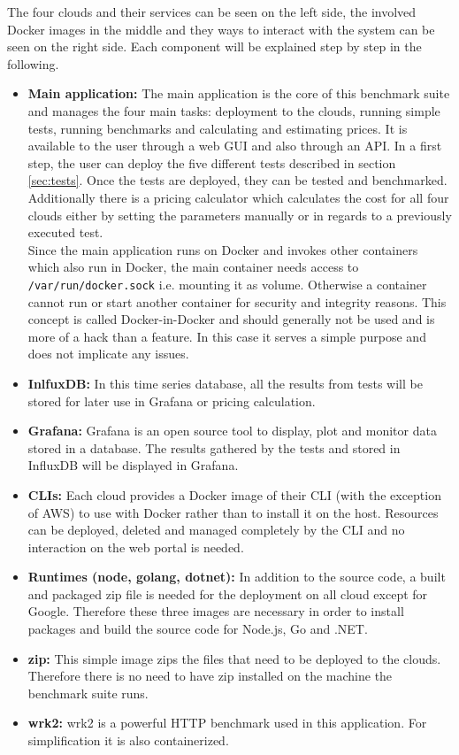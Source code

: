 The four clouds and their services can be seen on the left side, the involved Docker images in the middle and they ways to interact with the system can be seen on the right side. Each component will be explained step by step in the following.
\begin{itemize}
    \item \textbf{Main application:} The main application is the core of this benchmark suite and manages the four main tasks: deployment to the clouds, running simple tests, running benchmarks and calculating and estimating prices. It is available to the user through a web \gls{GUI} and also through an \gls{API}. In a first step, the user can deploy the five different tests described in section \ref{sec:tests}. Once the tests are deployed, they can be tested and benchmarked. Additionally there is a pricing calculator which calculates the cost for all four clouds either by setting the parameters manually or in regards to a previously executed test.\\
    Since the main application runs on Docker and invokes other containers which also run in Docker, the main container needs access to \texttt{/var/run/docker.sock} i.e. mounting it as volume. Otherwise a container cannot run or start another container for security and integrity reasons. This concept is called Docker-in-Docker and should generally not be used and is more of a hack than a feature. In this case it serves a simple purpose and does not implicate any issues.
    \item \textbf{InlfuxDB:} In this time series database, all the results from tests will be stored for later use in Grafana or pricing calculation.
    \item \textbf{Grafana:} Grafana is an open source tool to display, plot and monitor data stored in a database. The results gathered by the tests and stored in InfluxDB will be displayed in Grafana.
    \item \textbf{CLIs:} Each cloud provides a Docker image of their \gls{CLI} (with the exception of \gls{AWS}) to use with Docker rather than to install it on the host. Resources can be deployed, deleted and managed completely by the \gls{CLI} and no interaction on the web portal is needed. 
    \item \textbf{Runtimes (node, golang, dotnet):} In addition to the source code, a built and packaged zip file is needed for the deployment on all cloud except for Google. Therefore these three images are necessary in order to install packages and build the source code for Node.js, Go and .NET.
    \item \textbf{zip:} This simple image zips the files that need to be deployed to the clouds. Therefore there is no need to have zip installed on the machine the benchmark suite runs.
    \item \textbf{wrk2:} wrk2 is a powerful \gls{HTTP} benchmark used in this application. For simplification it is also containerized.
\end{itemize}

